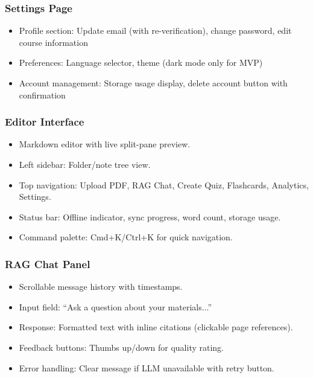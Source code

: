 \documentclass[12pt,a4paper]{article}
\begin{document}
\subsubsection{Settings Page}

\begin{itemize}
    \item Profile section: Update email (with re-verification), change password, edit course information
    \item Preferences: Language selector, theme (dark mode only for MVP)
    \item Account management: Storage usage display, delete account button with confirmation
\end{itemize}

\subsubsection{Editor Interface}

\begin{itemize}
    \item Markdown editor with live split-pane preview.
    \item Left sidebar: Folder/note tree view.
    \item Top navigation: Upload PDF, RAG Chat, Create Quiz, Flashcards, Analytics, Settings.
    \item Status bar: Offline indicator, sync progress, word count, storage usage.
    \item Command palette: Cmd+K/Ctrl+K for quick navigation.
\end{itemize}

\subsubsection{RAG Chat Panel}

\begin{itemize}
    \item Scrollable message history with timestamps.
    \item Input field: ``Ask a question about your materials...''
    \item Response: Formatted text with inline citations (clickable page references).
    \item Feedback buttons: Thumbs up/down for quality rating.
    \item Error handling: Clear message if LLM unavailable with retry button.
\end{itemize}
\end{document}
